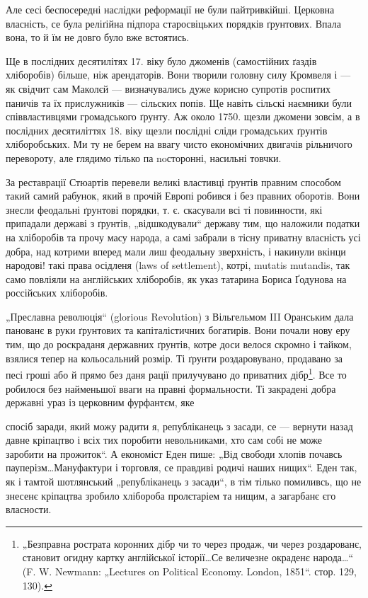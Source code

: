 Але сесі беспосередні наслідки реформації не були
пайтривкійші. Церковна власність, се була реліґійна підпора
старосвіцьких порядків ґрунтових. Впала вона, то й їм не
довго було вже встоятись.

Ще в послідних десятилітях 17. віку було джоменів
(самостійних ґаздів хліборобів) більше, ніж арендаторів.
Вони творили головну силу Кромвеля і — як свідчит сам
Маколєй — визначувались дуже корисно супротів роспитих
паничів та їх прислужників — сільских попів. Ще навіть
сільскі наємники були співвластивцями громадського ґрунту.
Аж около 1750. щезли джомени зовсім, а в послідних десятиліттях
18. віку щезли послідні сліди громадських ґрунтів
хліборобських. Ми ту не берем на ввагу чисто економічних
двигачів рільничого перевороту, але глядимо тілько па noсторонні,
насильні товчки.

За реставрації Стюартів перевели великі властивці
ґрунтів правним способом такий самий рабунок, який в прочій
Европі робився і без правних оборотів. Вони знесли
феодальні ґрунтові порядки, т. є. скасували всі ті повинности,
які припадали державі з ґрунтів, „відшкодували“ державу
тим, що наложили податки на хліборобів та прочу
масу народа, а самі забрали в тісну приватну власність усі
добра, над котрими вперед мали лиш феодальну зверхність,
і накинули вкінци народові! такі права осідленя (laws of
settlement), котрі, mutatis mutandis, так само повліяли на
англійських хліборобів, як указ татарина Бориса Ґодунова
на россійських хліборобів.

„Преславна революція“ (glorious Revolution) з Вільгельмом
III Оранським дала панованє в руки ґрунтових та капіталістичних
богатирів. Вони почали нову еру тим, що до
роскраданя державних ґрунтів, котре доси велося скромно
і тайком, взялися тепер на кольосальний розмір. Ті ґрунти
роздаровувано, продавано за песі гроші або й прямо без
даня рації прилучувано до приватних дібр\footnote{
„Безправна рострата коронних дібр чи то через продаж, чи через
роздарованє, становит огидну картку англійської історії\dots Се величезне
окраденє народа\dots“ (F. W. Newmann: „Lectures on Political Economy.
London, 1851“. стор. 129, 130).
}. Все то робилося
без найменьшої вваги на правні формальности. Ті закрадені
добра державні ураз із церковним фурфантєм, яке

спосіб заради, який можу радити я, републіканець з засади, се — вернути
назад давне кріпацтво і всіх тих поробити невольниками, хто сам
собі не може заробити на прожиток“. А економіст Еден пише: „Від свободи
хлопів почавсь пауперізм\dots Мануфактури і торговля, се правдиві
родичі наших нищих“. Еден так, як і тамтой шотлянський „републіканець
з засади“, в тім тілько помиливсь, що не знесенє кріпацтва зробило хлібороба
пролєтаріем та нищим, а загарбанє єго власности.